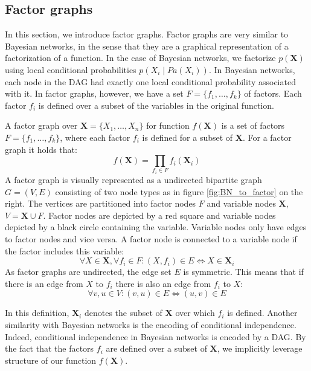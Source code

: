 \subsection{Factor graphs}
In this section, we introduce factor graphs. Factor graphs are
very similar to Bayesian networks, in the sense that they are
a graphical representation of a factorization of a function. 
In the case of Bayesian networks, we factorize $p(\textbf{X})$
using local conditional probabilities $p(X_i \mid Pa(X_i))$.
In Bayesian networks, each node in the DAG had exactly one
local conditional probability associated with it. 
In factor graphs, however, we have a set $F=\{f_1, \dots, f_k\}$
of factors. Each factor $f_i$ is defined over a subset of the variables
in the original function.

\begin{defn}
A factor graph over $\textbf{X}= \{X_1, \dots, X_n\}$ for function
$f(\textbf{X})$ is a set of factors $F=\{f_1, \dots, f_k\}$, where
each factor $f_i$ is defined for a subset of $\textbf{X}$. For a factor
graph it holds that:
\begin{equation}
f(\textbf{X}) = \prod_{f_i\in F} f_i(\textbf{X}_i)
\end{equation}
A factor graph is visually represented as a undirected bipartite graph
$G = (V, E)$ consisting of two node types as in figure 
\ref{fig:BN_to_factor} on the right.
The vertices are partitioned into factor nodes $F$ and variable 
nodes $\textbf{X}$, $V = \textbf{X}\cup F$. Factor nodes are 
depicted by a red square and variable nodes depicted by a black
circle containing the variable. Variable nodes only have edges to
factor nodes and vice versa. A factor node is connected to a variable
node if the factor includes this variable:
\begin{equation}
\forall X \in \textbf{X}, \forall f_i \in F: (X, f_i) 
	\in E \Leftrightarrow X \in \textbf{X}_i 
\end{equation}
As factor graphs are undirected, the edge set $E$ is symmetric. 
This means that if there is an edge from $X$ to $f_i$ there is
also an edge from $f_i$ to $X$:
\begin{equation}
\forall v, u \in V: (v, u) \in E \Leftrightarrow (u, v) \in E
\end{equation}
\end{defn}

\noindent
In this definition, $\textbf{X}_i$ denotes the subset of
$\textbf{X}$ over which $f_i$ is defined.
Another similarity with Bayesian networks is the encoding of 
conditional independence. Indeed, conditional independence
in Bayesian networks is encoded by a DAG. By the fact that
the factors $f_i$ are defined over a subset of $\textbf{X}$,
we implicitly leverage structure of our function $f(\textbf{X})$.

